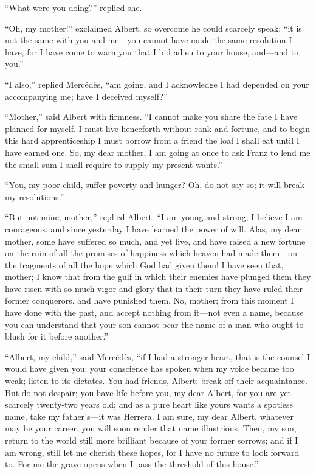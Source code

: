 “What were you doing?” replied she.

“Oh, my mother!” exclaimed Albert, so overcome he could scarcely speak;
“it is not the same with you and me—you cannot have made the same
resolution I have, for I have come to warn you that I bid adieu to your
house, and—and to you.”

“I also,” replied Mercédès, “am going, and I acknowledge I had depended
on your accompanying me; have I deceived myself?”

“Mother,” said Albert with firmness. “I cannot make you share the fate
I have planned for myself. I must live henceforth without rank and
fortune, and to begin this hard apprenticeship I must borrow from a
friend the loaf I shall eat until I have earned one. So, my dear
mother, I am going at once to ask Franz to lend me the small sum I
shall require to supply my present wants.”

“You, my poor child, suffer poverty and hunger? Oh, do not say so; it
will break my resolutions.”

“But not mine, mother,” replied Albert. “I am young and strong; I
believe I am courageous, and since yesterday I have learned the power
of will. Alas, my dear mother, some have suffered so much, and yet
live, and have raised a new fortune on the ruin of all the promises of
happiness which heaven had made them—on the fragments of all the hope
which God had given them! I have seen that, mother; I know that from
the gulf in which their enemies have plunged them they have risen with
so much vigor and glory that in their turn they have ruled their former
conquerors, and have punished them. No, mother; from this moment I have
done with the past, and accept nothing from it—not even a name, because
you can understand that your son cannot bear the name of a man who
ought to blush for it before another.”

“Albert, my child,” said Mercédès, “if I had a stronger heart, that is
the counsel I would have given you; your conscience has spoken when my
voice became too weak; listen to its dictates. You had friends, Albert;
break off their acquaintance. But do not despair; you have life before
you, my dear Albert, for you are yet scarcely twenty-two years old; and
as a pure heart like yours wants a spotless name, take my father’s—it
was Herrera. I am sure, my dear Albert, whatever may be your career,
you will soon render that name illustrious. Then, my son, return to the
world still more brilliant because of your former sorrows; and if I am
wrong, still let me cherish these hopes, for I have no future to look
forward to. For me the grave opens when I pass the threshold of this
house.”

